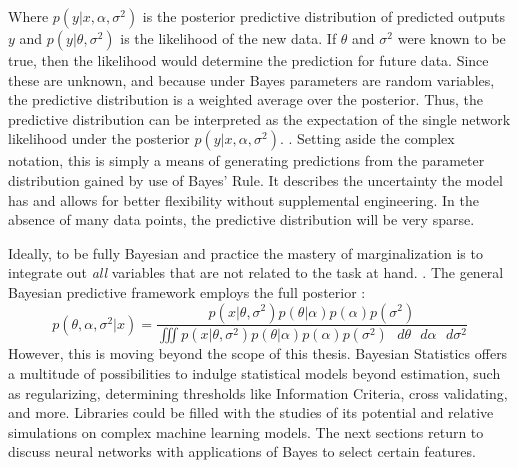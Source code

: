 Where  $p(y|x,\alpha,\sigma^2)$ is the posterior predictive distribution of predicted outputs $y$ and $p(y|\theta,\sigma^2)$ is the likelihood of the new data.  If $\theta$ and $\sigma^2$ were known to be true, then the likelihood would determine the prediction for future data.  Since these are unknown, and because under Bayes parameters are random variables, the predictive distribution is a weighted average over the posterior.  Thus, the  predictive distribution can be interpreted as the expectation of the single network likelihood under the posterior $p(y|x,\alpha,\sigma^2)$. \cite{salad} \cite{Jospin}.  
Setting aside the complex notation, this is simply a means of generating predictions from the parameter distribution gained by use of Bayes' Rule.  It describes the uncertainty the model has and allows for better flexibility without supplemental engineering.
In the absence of many data points, the predictive distribution will be very sparse. \cite{tipping2004bayesian}


Ideally, to be fully Bayesian and practice the mastery of marginalization is to integrate out \textit{all} variables that are not related to the task at hand. \cite{bishop2006pattern}.  The general Bayesian predictive framework employs the full posterior \cite{tipping2004bayesian}:
$$
p(\theta,\alpha,\sigma^2|x) = \frac{p(x|\theta,\sigma^2) p(\theta|\alpha)p(\alpha)p(\sigma^2)}{\iiint p(x|\theta,\sigma^2)p(\theta|\alpha)p(\alpha)p(\sigma^2) \text{ } d\theta \text{ } d\alpha \text{ } d\sigma^2}
$$
However, this is moving beyond the scope of this thesis.  Bayesian Statistics offers a multitude of possibilities to indulge statistical models beyond estimation, such as regularizing, determining thresholds like Information Criteria, cross validating, and more.  Libraries could be filled with the studies of its potential and relative simulations on complex machine learning models.  The next sections return to discuss neural networks with applications of Bayes to select certain features.

\begin{comment}
\subsection{Predictive Accuracy Measures}
I feel I need to put Bayes-CV somewhere...

Mention of their frequentist analog (for lppd is is the log-probability score on Rethinking p. 214)

\textbf{Bayesian Cross-Validation} to get the log-pointwise predictive density
$$
lppd_{CV} = \sum_{i=1}^N \frac{1}{S} \sum_{s=1}^S logP(w_i|\theta_{-i,s})
$$

\textbf{Information Criteria} also found in Rethinking (p. 223) and BDA (p. 169)
\end{comment}

